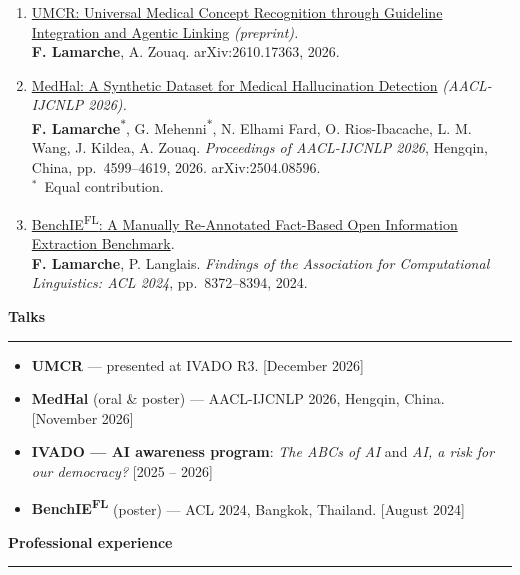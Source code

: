 \documentclass[10pt,a4paper]{article}
\newcommand{\cvsec}[1]{%
  \vspace{10pt}%
  {\noindent\large\bfseries #1\par}%
  \vspace{2pt}\hrule\vspace{7pt}%
}
\newcommand{\dates}[1]{\hfill\textnormal{\small[#1]}}
\begin{document}
\renewcommand{\labelenumi}{[\theenumi]}
\begin{enumerate}
  \setlength{\itemsep}{3pt}
  \item \href{https://arxiv.org/abs/2610.17363}{UMCR: Universal Medical Concept Recognition
        through Guideline Integration and Agentic Linking} \emph{(preprint).}\\
        \textbf{F. Lamarche}, A. Zouaq. arXiv:2610.17363, 2026.

  \item \href{https://aclanthology.org/2026.aacl-long.208/}{MedHal: A Synthetic Dataset for Medical
        Hallucination Detection} \emph{(AACL-IJCNLP 2026).}\\
        \textbf{F. Lamarche}\textsuperscript{$*$}, G. Mehenni\textsuperscript{$*$}, N. Elhami
        Fard, O. Rios-Ibacache, L. M. Wang, J. Kildea, A. Zouaq. \emph{Proceedings of
        AACL-IJCNLP 2026}, Hengqin, China, pp.\ 4599--4619, 2026. arXiv:2504.08596.\\
        {\small$^*$~Equal contribution.}

  \item \href{https://aclanthology.org/2024.findings-acl.496/}{BenchIE\textsuperscript{FL}: A
        Manually Re-Annotated Fact-Based Open Information Extraction Benchmark}.\\
        \textbf{F. Lamarche}, P. Langlais. \emph{Findings of the Association for Computational
        Linguistics: ACL 2024}, pp.\ 8372--8394, 2024.
\end{enumerate}

\cvsec{Talks}

\begin{itemize}
  \setlength{\itemsep}{3pt}
  \item \textbf{UMCR} --- presented at IVADO R3. \dates{December 2026}
  \item \textbf{MedHal} (oral \& poster) --- AACL-IJCNLP 2026, Hengqin, China.
        \dates{November 2026}
  \item \textbf{IVADO --- AI awareness program}: \emph{The ABCs of AI} and
        \emph{AI, a risk for our democracy?} \dates{2025 -- 2026}
  \item \textbf{BenchIE\textsuperscript{FL}} (poster) --- ACL 2024, Bangkok, Thailand.
        \dates{August 2024}
\end{itemize}

\cvsec{Professional experience}
\end{document}

